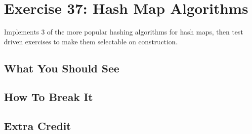 \chapter{Exercise 37: Hash Map Algorithms}

Implements 3 of the more popular hashing algorithms for hash maps, then test driven exercises to
make them selectable on construction.

\section{What You Should See}


\section{How To Break It}


\section{Extra Credit}




